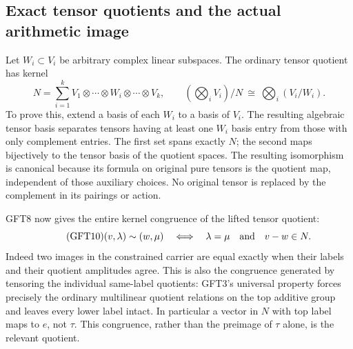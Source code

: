 \subsection{Exact tensor quotients and the actual arithmetic image}

Let $W_i\subset V_i$ be arbitrary complex linear subspaces. The
ordinary tensor quotient has kernel
\begin{equation}\tag{GFT9}
 N=\sum_{i=1}^k V_1\otimes\cdots\otimes W_i\otimes\cdots\otimes V_k,
 \qquad
 \left(\bigotimes_i V_i\right)/N
                 \ \cong\ \bigotimes_i(V_i/W_i).
\end{equation}
To prove this, extend a basis of each $W_i$ to a basis of $V_i$.
The resulting algebraic tensor basis separates tensors having
at least one $W_i$ basis entry from those with only complement
entries. The first set spans exactly $N$; the second maps
bijectively to the tensor basis of the quotient spaces. The
resulting isomorphism is canonical because its formula on original
pure tensors is the quotient map, independent of those auxiliary
choices. No original tensor is replaced by the complement in its
pairings or action.

GFT8 now gives the entire kernel congruence of the lifted tensor
quotient:
\begin{equation}\tag{GFT10}
 (v,\lambda)\sim(w,\mu)
       \quad\Longleftrightarrow\quad
       \lambda=\mu\quad\hbox{and}\quad v-w\in N.
\end{equation}
Indeed two images in the constrained carrier are equal exactly
when their labels and their quotient amplitudes agree. This is
also the congruence generated by tensoring the individual
same-label quotients: GFT3's universal property forces precisely
the ordinary multilinear quotient relations on the top additive
group and leaves every lower label intact. In particular a vector
in $N$ with top label maps to $e$, not $\tau$. This congruence,
rather than the preimage of $\tau$ alone, is the relevant quotient.

